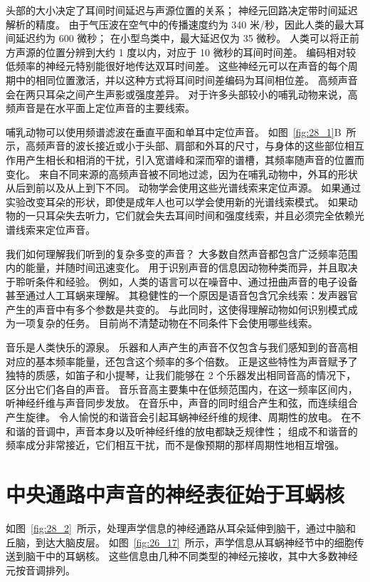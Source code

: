 头部的大小决定了耳间时间延迟与声源位置的关系； 神经元回路决定带时间延迟解析的精度。
由于气压波在空气中的传播速度约为 340 米/秒，因此人类的最大耳间延迟约为 600 微秒；
在小型鸟类中，最大延迟仅为 35 微秒。
人类可以将正前方声源的位置分辨到大约 1 度以内，对应于 10 微秒的耳间时间差。
编码相对较低频率的神经元特别能很好地传达双耳时间差。
这些神经元可以在声音的每个周期中的相同位置激活，并以这种方式将耳间时间差编码为耳间相位差。
高频声音会在两只耳朵之间产生声影或强度差异。
对于许多头部较小的哺乳动物来说，高频声音是在水平面上定位声音的主要线索。


哺乳动物可以使用频谱滤波在垂直平面和单耳中定位声音。
如图~\ref{fig:28_1}B~所示，高频声音的波长接近或小于头部、肩部和外耳的尺寸，与身体的这些部位相互作用产生相长和相消的干扰，引入宽谱峰和深而窄的谱槽，其频率随声音的位置而变化。
来自不同来源的高频声音被不同地过滤，因为在哺乳动物中，外耳的形状从后到前以及从上到下不同。
动物学会使用这些光谱线索来定位声源。
如果通过实验改变耳朵的形状，即使是成年人也可以学会使用新的光谱线索模式。
如果动物的一只耳朵失去听力，它们就会失去耳间时间和强度线索，并且必须完全依赖光谱线索来定位声音。


我们如何理解我们听到的复杂多变的声音？
大多数自然声音都包含广泛频率范围内的能量，并随时间迅速变化。
用于识别声音的信息因动物种类而异，并且取决于聆听条件和经验。
例如，人类的语言可以在噪音中、通过扭曲声音的电子设备甚至通过人工耳蜗来理解。
其稳健性的一个原因是语音包含冗余线索：发声器官产生的声音中有多个参数是共变的。
与此同时，这使得理解动物如何识别模式成为一项复杂的任务。
目前尚不清楚动物在不同条件下会使用哪些线索。


音乐是人类快乐的源泉。
乐器和人声产生的声音不仅包含与我们感知到的音高相对应的基本频率能量，还包含这个频率的多个倍数。
正是这些特性为声音赋予了独特的质感，如笛子和小提琴，让我们能够在 2 个乐器发出相同音高的情况下，区分出它们各自的声音。
音乐音高主要集中在低频范围内，在这一频率区间内，听神经纤维与声音同步发放。
在音乐中，声音的同时组合产生和弦，而连续组合产生旋律。
令人愉悦的和谐音会引起耳蜗神经纤维的规律、周期性的放电。
在不和谐的音调中，声音本身以及听神经纤维的放电都缺乏规律性；
组成不和谐音的频率成分非常接近，它们相互干扰，而不是像预期的那样周期性地相互增强。



\section{中央通路中声音的神经表征始于耳蜗核}

如图~\ref{fig:28_2}~所示，处理声学信息的神经通路从耳朵延伸到脑干，通过中脑和丘脑，到达大脑皮层。
如图~\ref{fig:26_17}~所示，声学信息从耳蜗神经节中的细胞传送到脑干中的耳蜗核。
这些信息由几种不同类型的神经元接收，其中大多数神经元按音调排列。


